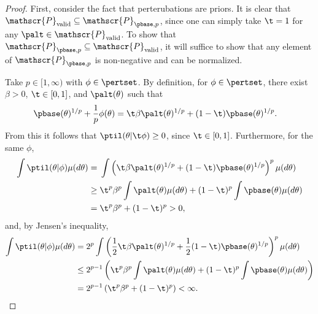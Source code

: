 


\begin{proof}
%
First, consider the fact that perterubations are priors. It is clear that
$\mathscr{P}_{\mathrm{valid}} \subseteq \mathscr{P}_{\pbase,p}$, since one can
simply take $\t = 1$ for any $\palt \in \mathscr{P}_{\mathrm{valid}}$.  To show
that $\mathscr{P}_{\pbase,p} \subseteq \mathscr{P}_{\mathrm{valid}}$, it will
suffice to show that any element of $\mathscr{P}_{\pbase,p}$ is non-negative and
can be normalized.

Take $p \in [1, \infty)$ with $\phi \in \pertset$.  By definition, for $\phi \in
\pertset$, there exist $\beta > 0$, $\t \in [0,1]$, and $\palt(\theta)$ such
that
%
\begin{align*}
%
\pbase(\theta)^{1/p} + \frac{1}{p} \phi(\theta) ={}&
    \t \beta \palt(\theta)^{1/p} + (1- \t) \pbase(\theta)^{1/p}.
%
\end{align*}
%
From this it follows that $\ptil(\theta \vert \t \phi) \ge 0$, since $\t \in
[0,1]$.  Furthermore, for the same $\phi$,
%
\begin{align*}
%
\int \ptil(\theta \vert \phi) \mu(d\theta) ={}&
\int \left(\t \beta \palt(\theta)^{1/p} +
           (1- \t) \pbase(\theta)^{1/p} \right)^{p} \mu(d\theta)
\\\ge{}&
\t^p \beta^p \int \palt(\theta) \mu(d\theta) +
    (1- \t)^p \int \pbase(\theta) \mu(d\theta)
\\={}& \t^p \beta^p + (1- \t)^p > 0,
%
\end{align*}
%
and, by Jensen's inequality,
%
\begin{align*}
%
\int \ptil(\theta \vert \phi) \mu(d\theta) ={}&
2^p \int \left(\frac{1}{2} \t \beta \palt(\theta)^{1/p} +
           \frac{1}{2} (1- \t) \pbase(\theta)^{1/p} \right)^{p} \mu(d\theta)
\\\le{}&
%
2^{p-1} \left(
    \t^p \beta^p \int \palt(\theta) \mu(d\theta) +
    (1- \t)^p \int  \pbase(\theta)\mu(d\theta)
\right)
\\={}& 2^{p-1} \left( \t^p \beta^p + (1- \t)^p\right) < \infty.
%
\end{align*}


\end{proof}
